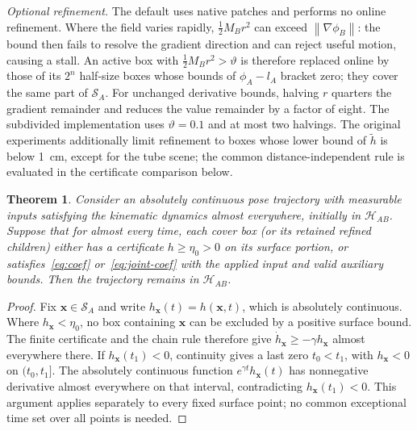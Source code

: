 \documentclass[journal]{IEEEtran}
\newtheorem{theorem}{Theorem}
\theoremstyle{definition}
\newcommand{\norm}[1]{\left\lVert #1\right\rVert}
\begin{document}
\emph{Optional refinement.} The default uses native patches and performs no online refinement.
Where the field varies rapidly, $\frac12M_Br^2$ can exceed
$\norm{\nabla\phi_B}$: the bound then fails to resolve the gradient direction and can reject useful
motion, causing a stall. An active box
with $\frac12M_Br^2>\vartheta$ is therefore replaced online by those of its $2^n$ half-size boxes whose
bounds of $\phi_A-l_A$ bracket zero; they cover the same part of $\mathcal S_A$.
For unchanged derivative bounds, halving $r$ quarters the gradient remainder and reduces the
value remainder by a factor of eight. The subdivided implementation uses $\vartheta=0.1$ and at most two halvings.
The original experiments additionally limit refinement to boxes whose lower bound of $\tilde h$
is below 1~cm, except for the tube scene; the common distance-independent rule is evaluated
in the certificate comparison below.
\begin{theorem}\label{thm:invariance}
Consider an absolutely continuous pose trajectory with measurable inputs satisfying the
kinematic dynamics almost everywhere, initially in $\mathcal H_{AB}$. Suppose that for almost
every time, each cover box (or its retained refined children) either has a certificate
$h\ge\eta_0>0$ on its surface portion, or satisfies~\eqref{eq:coef} or~\eqref{eq:joint-coef}
with the applied input and valid auxiliary bounds. Then the trajectory remains in $\mathcal H_{AB}$.
\end{theorem}
\begin{proof}
Fix $\mathbf x\in\mathcal S_A$ and write $h_{\mathbf x}(t)=h(\mathbf x,t)$, which is absolutely
continuous. Where $h_{\mathbf x}<\eta_0$, no box containing $\mathbf x$ can be excluded by a
positive surface bound. The finite certificate and the chain rule therefore give
$\dot h_{\mathbf x}\ge-\gamma h_{\mathbf x}$ almost everywhere there. If $h_{\mathbf x}(t_1)<0$,
continuity gives a last zero $t_0<t_1$, with $h_{\mathbf x}<0$ on $(t_0,t_1]$.
The absolutely continuous function $e^{\gamma t}h_{\mathbf x}(t)$ has nonnegative derivative
almost everywhere on that interval, contradicting $h_{\mathbf x}(t_1)<0$. This argument applies
separately to every fixed surface point; no common exceptional time set over all points is needed.
\end{proof}
\end{document}

